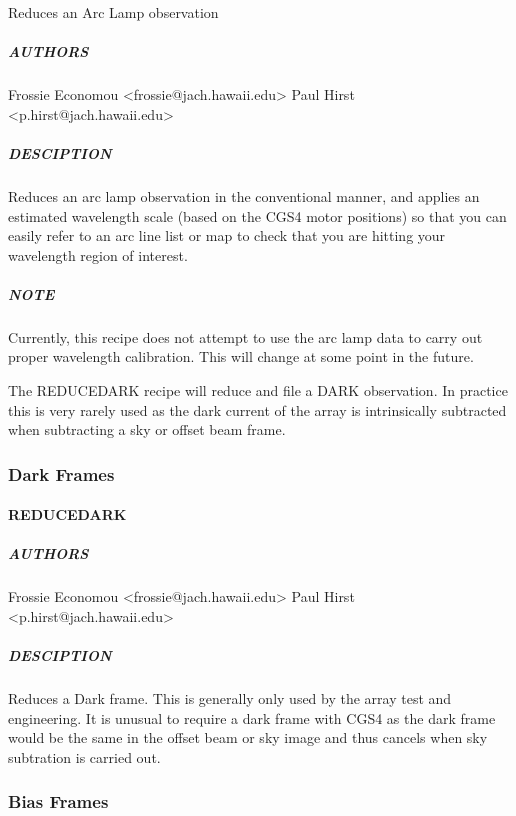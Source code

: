 \documentclass[twoside,11pt]{article}
\renewcommand{\_}{\texttt{\symbol{95}}}
\begin{document}
Reduces an Arc Lamp observation

\subparagraph*{AUTHORS\label{REDUCE_ARC_AUTHORS}}

Frossie Economou <frossie@jach.hawaii.edu>
Paul Hirst <p.hirst@jach.hawaii.edu>

\subparagraph*{DESCIPTION\label{REDUCE_ARC_DESCIPTION}}

Reduces an arc lamp observation in the conventional manner, and
applies an estimated wavelength scale (based on the CGS4 motor
positions) so that you can easily refer to an arc line list or map to
check that you are hitting your wavelength region of interest.

\subparagraph*{NOTE\label{REDUCE_ARC_NOTE}}

Currently, this recipe does not attempt to use the arc lamp data to
carry out proper wavelength calibration. This will change at some
point in the future.


The REDUCE\_DARK recipe will reduce and file a DARK observation. In
practice this is very rarely used as the dark current of the array is
intrinsically subtracted when subtracting a sky or offset beam frame.

\subsubsection{Dark Frames}


\paragraph*{REDUCE\_DARK\label{REDUCE_DARK}}



\subparagraph*{AUTHORS\label{REDUCE_DARK_AUTHORS}}

Frossie Economou <frossie@jach.hawaii.edu>
Paul Hirst <p.hirst@jach.hawaii.edu>

\subparagraph*{DESCIPTION\label{REDUCE_DARK_DESCIPTION}}

Reduces a Dark frame. This is generally only used by the array test
and engineering. It is unusual to require a dark frame with CGS4 as
the dark frame would be the same in the offset beam or sky image and
thus cancels when sky subtration is carried out.


\subsubsection{Bias Frames}
\end{document}

